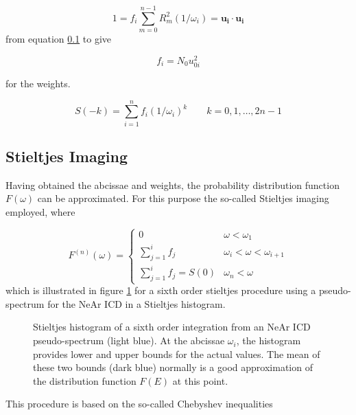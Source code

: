 \begin{equation}
  1 = f_i \sum\limits_{m=0}^{n-1} R_m^2 (1/\omega_i) = \mathbf{u_i} \cdot \mathbf{u_i}
\end{equation}
from equation \ref{} to give

\begin{equation}
  f_i = N_0 u_{0i}^2
\end{equation}

for the weights.

\begin{equation}
  S(-k) = \sum\limits_{i=1}^n f_i (1/\omega_i)^k \quad\quad k=0,1,\dots,2n-1
\end{equation}





\subsection{Stieltjes Imaging}
Having obtained the abcissae and weights, the probability distribution function
$F(\omega)$ can be approximated. For this purpose the so-called Stieltjes imaging
employed, where

\begin{equation}
  F^{(n)} (\omega) =
  \begin{cases}
    0                                & \omega < \omega_1\\
    \sum\limits_{j=1}^{i} f_j        & \omega_i < \omega < \omega_{i+1}\\
    \sum\limits_{j=1}^{i} f_j = S(0) & \omega_n < \omega 
  \end{cases}
\end{equation}
which is illustrated in figure \ref{figure:stieltjes_imaging} for a sixth
order stieltjes procedure using a pseudo-spectrum for the NeAr ICD in a
Stieltjes histogram.


\begin{figure}[h]
  \centering
  
  \caption{Stieltjes histogram of a sixth order integration from
           an NeAr ICD pseudo-spectrum (light blue). At the abcissae $\omega_i$,
           the histogram provides lower and upper bounds for the actual
           values. The mean of these two bounds (dark blue) normally is a good
           approximation of the distribution function $F(E)$ at this point.}
  \label{figure:stieltjes_imaging}
\end{figure}

This procedure is based on the so-called Chebyshev inequalities

